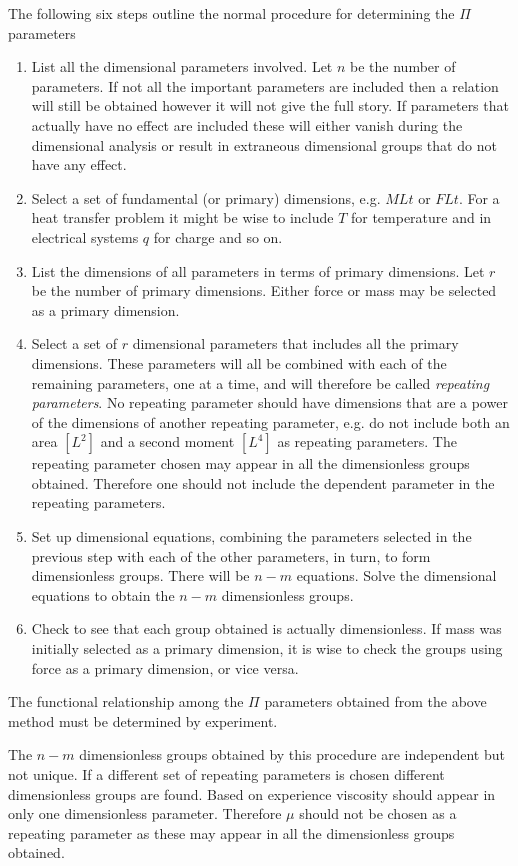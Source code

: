 The following six steps outline the normal procedure for determining the $\Pi$ parameters
\begin{enumerate}
  \item List all the dimensional parameters involved. Let $n$ be the number of parameters. If not all the important parameters are included then a relation will still be obtained however it will not give the full story. If parameters that actually have no effect are included these will either vanish during the dimensional analysis or result in extraneous dimensional groups that do not have any effect.
  \item Select a set of fundamental (or primary) dimensions, e.g. $MLt$ or $FLt$. For a heat transfer problem it might be wise to include $T$ for temperature and in electrical systems $q$ for charge and so on.
  \item List the dimensions of all parameters in terms of primary dimensions. Let $r$ be the number of primary dimensions. Either force or mass may be selected as a primary dimension.
  \item Select a set of $r$ dimensional parameters that includes all the primary dimensions. These parameters will all be combined with each of the remaining parameters, one at a time, and will therefore be called \textit{repeating parameters}. No repeating parameter should have dimensions that are a power of the dimensions of another repeating parameter, e.g. do not include both an area $\left[ L^2 \right]$ and a second moment $\left[ L^{4} \right]$ as repeating parameters. The repeating parameter chosen may appear in all the dimensionless groups obtained. Therefore one should not include the dependent parameter in the repeating parameters.
  \item Set up dimensional equations, combining the parameters selected in the previous step with each of the other parameters, in turn, to form dimensionless groups. There will be $n-m$ equations. Solve the dimensional equations to obtain the $n-m$ dimensionless groups.
  \item Check to see that each group obtained is actually dimensionless. If mass was initially selected as a primary dimension, it is wise to check the groups using force as a primary dimension, or vice versa.
\end{enumerate}
The functional relationship among the $\Pi$ parameters obtained from the above method must be determined by experiment.

The $n-m$ dimensionless groups obtained by this procedure are independent but not unique. If a different set of repeating parameters is chosen different dimensionless groups are found. Based on experience viscosity should appear in only one dimensionless parameter. Therefore $\mu$ should not be chosen as a repeating parameter as these may appear in all the dimensionless groups obtained.

